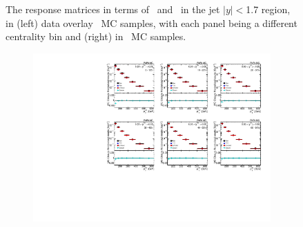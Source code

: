 \begin{figure}
\begin{subfigure}{0.30\textwidth}
\caption{}
\label{fig:pp_jetspect_respmatrix}
\end{subfigure}
\caption{The response matrices in terms of \ptjetreco\ and \ptjettruth\ in the jet $|y| < $1.7 region, in (left) data overlay \pbpb\ MC samples, with each panel being a different centrality bin and (right) in \pp\ MC samples.}
\label{fig:jetspect_respmatrix}
\end{figure}



\begin{figure}
\begin{subfigure}{0.7\textwidth}
\centering
\includegraphics[page=5, width=1\textwidth]{figures/main/corrections/spect_closure_PbPb_MC.pdf}
\caption{}
\label{fig:PbPb_jetspect_closure}
\end{subfigure} 
\begin{subfigure}{0.30\textwidth}
\centering

\end{subfigure}
\end{figure}
